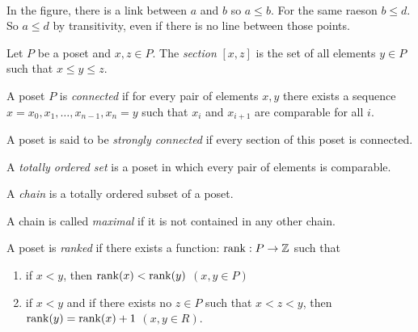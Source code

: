 \paragraph{}
In the figure, there is a link between $a$ and $b$ so $a \le b$. For the same raeson $b \le d$. So $a \le d$ by transitivity, even if there is no line between those points.

\begin{definition}[Section]
  Let $P$ be a poset and $x, z \in P$. The \textit{section} $[x,z]$ is the set of all elements $y \in P$ such that $x \le y \le z$.
\end{definition}

\begin{definition}
  A poset $P$ is \textit{connected} if for every pair of elements $x, y$ there exists a sequence $x = x_0, x_1, \dots, x_{n-1}, x_n = y$ such that $x_i$ and $x_{i+1}$ are comparable for all $i$.
\end{definition}

\begin{definition}
  A poset is said to be \textit{strongly connected} if every section of this poset is connected.
\end{definition}


\begin{definition}
  A \textit{totally ordered set} is a poset in which every pair of elements is comparable.
\end{definition}

\begin{definition}[Chain]
  A \textit{chain} is a totally ordered subset of a poset.
\end{definition}

\begin{definition}
  A chain is called \textit{maximal} if it is not contained in any other chain.
\end{definition}

\begin{definition}
  A poset is \textit{ranked} if there exists a function: $\operatorname{rank} : P \to \mathbb Z$ such that
  \begin{enumerate}
    \item if $x < y$, then $\operatorname{rank}(x) < \operatorname{rank}(y)$ $(x, y \in P)$
    \item if $x < y$ and if there exists no $z \in P$ such that $x < z < y$, then $\operatorname{rank}(y) = \operatorname{rank}(x) + 1$ $(x, y \in R)$.
  \end{enumerate}
\end{definition}

